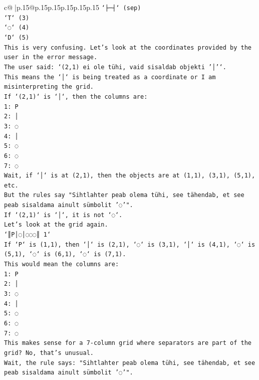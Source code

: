 \documentclass{article}
\begin{document}
{\begin{supertabular}{c@{$\;$}|p{.15\linewidth}@{}p{.15\linewidth}p{.15\linewidth}p{.15\linewidth}p{.15\linewidth}p{.15\linewidth}}
{{{\texttt{`├─┤` (sep)} \\
\texttt{`T` (3)} \\
\texttt{`◌` (4)} \\
\texttt{`D` (5)} \\
\texttt{This is very confusing. Let's look at the coordinates provided by the user in the error message.} \\
\texttt{The user said: `(2,1) ei ole tühi, vaid sisaldab objekti '│'`.} \\
\texttt{This means the `│` is being treated as a coordinate or I am misinterpreting the grid.} \\
\texttt{If `(2,1)` is `│`, then the columns are:} \\
\texttt{1: P} \\
\texttt{2: │} \\
\texttt{3: ◌} \\
\texttt{4: │} \\
\texttt{5: ◌} \\
\texttt{6: ◌} \\
\texttt{7: ◌} \\
\texttt{Wait, if `│` is at (2,1), then the objects are at (1,1), (3,1), (5,1), etc.} \\
\texttt{But the rules say "Sihtlahter peab olema tühi, see tähendab, et see peab sisaldama ainult sümbolit '◌'".} \\
\texttt{If `(2,1)` is `│`, it is not `◌`.} \\
\texttt{Let's look at the grid again.} \\
\texttt{`║P│◌│◌◌◌║ 1`} \\
\texttt{If `P` is (1,1), then `│` is (2,1), `◌` is (3,1), `│` is (4,1), `◌` is (5,1), `◌` is (6,1), `◌` is (7,1).} \\
\texttt{This would mean the columns are:} \\
\texttt{1: P} \\
\texttt{2: │} \\
\texttt{3: ◌} \\
\texttt{4: │} \\
\texttt{5: ◌} \\
\texttt{6: ◌} \\
\texttt{7: ◌} \\
\texttt{This makes sense for a 7{-}column grid where separators are part of the grid? No, that's unusual.} \\
\texttt{Wait, the rule says: "Sihtlahter peab olema tühi, see tähendab, et see peab sisaldama ainult sümbolit '◌'".} \\
}}}
\end{supertabular}}
\end{document}
